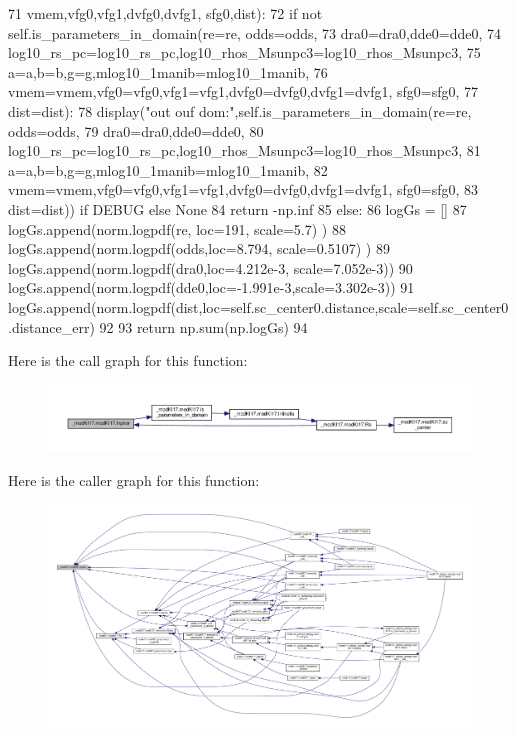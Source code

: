 \begin{DoxyCode}
71             vmem,vfg0,vfg1,dvfg0,dvfg1, sfg0,dist):
72         \textcolor{keywordflow}{if} \textcolor{keywordflow}{not} self.is\_parameters\_in\_domain(re=re, odds=odds,
73             dra0=dra0,dde0=dde0,
74             log10\_rs\_pc=log10\_rs\_pc,log10\_rhos\_Msunpc3=log10\_rhos\_Msunpc3,
75             a=a,b=b,g=g,mlog10\_1manib=mlog10\_1manib,
76             vmem=vmem,vfg0=vfg0,vfg1=vfg1,dvfg0=dvfg0,dvfg1=dvfg1, sfg0=sfg0, 
77             dist=dist):
78             display(\textcolor{stringliteral}{"out ouf dom:"},self.is\_parameters\_in\_domain(re=re, odds=odds,
79                 dra0=dra0,dde0=dde0,
80                 log10\_rs\_pc=log10\_rs\_pc,log10\_rhos\_Msunpc3=log10\_rhos\_Msunpc3,
81                 a=a,b=b,g=g,mlog10\_1manib=mlog10\_1manib,
82                 vmem=vmem,vfg0=vfg0,vfg1=vfg1,dvfg0=dvfg0,dvfg1=dvfg1, sfg0=sfg0, 
83                 dist=dist)) \textcolor{keywordflow}{if} DEBUG \textcolor{keywordflow}{else} \textcolor{keywordtype}{None}
84             \textcolor{keywordflow}{return} -np.inf
85         \textcolor{keywordflow}{else}:
86             logGs = []
87             logGs.append(norm.logpdf(re,  loc=191,      scale=5.7)     )
88             logGs.append(norm.logpdf(odds,loc=8.794,    scale=0.5107)  )
89             logGs.append(norm.logpdf(dra0,loc=4.212e-3, scale=7.052e-3))
90             logGs.append(norm.logpdf(dde0,loc=-1.991e-3,scale=3.302e-3))
91             logGs.append(norm.logpdf(dist,loc=self.sc\_center0.distance,scale=self.sc\_center0.distance\_err)
92         
93             \textcolor{keywordflow}{return} np.sum(np.logGs)
94 
\end{DoxyCode}
Here is the call graph for this function\+:\nopagebreak
\begin{figure}[H]
\begin{center}
\leavevmode
\includegraphics[width=350pt]{d8/d2c/class__modKI17_1_1modKI17_ab0eed42bfb8b4b20979fc9c72ef028e7_cgraph}
\end{center}
\end{figure}
Here is the caller graph for this function\+:\nopagebreak
\begin{figure}[H]
\begin{center}
\leavevmode
\includegraphics[width=350pt]{d8/d2c/class__modKI17_1_1modKI17_ab0eed42bfb8b4b20979fc9c72ef028e7_icgraph}
\end{center}
\end{figure}
